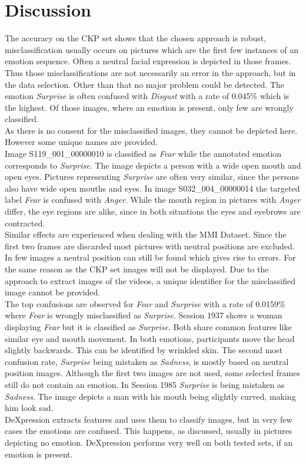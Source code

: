 \section{Discussion}
\label{sec:discussion}

The accuracy on the CKP set shows that the chosen approach is robust, misclassification usually occurs on pictures which are the first few instances of an emotion sequence. Often a neutral facial expression is depicted in those frames. Thus those misclassifications are not necessarily an error in the approach, but in the data selection. Other than that no major problem could be detected. The emotion \textit{Surprise} is often confused with \textit{Disgust} with a rate of 0.045\% which is the highest. Of those images, where an emotion is present, only few are wrongly classified.\\ 


As there is no consent for the misclassified images, they cannot be depicted here. However some unique names are provided. \\
Image S119\_001\_00000010 is classified as \textit{Fear} while the annotated emotion corresponds to \textit{Surprise}. The image depicts a person with a wide open mouth and open eyes. Pictures representing \textit{Surprise} are often very similar, since the persons also have wide open mouths and eyes. In image S032\_004\_00000014 the targeted label \textit{Fear} is confused with \textit{Anger}. While the mouth region in pictures with \textit{Anger} differ, the eye regions are alike, since in both situations the eyes and eyebrows are contracted.\\
Similar effects are experienced when dealing with the MMI Dataset. Since the first two frames are discarded most pictures with neutral positions are excluded. In few images a neutral position can still be found which gives rise to errors. For the same reason as the CKP set images will not be displayed. Due to the approach to extract images of the videos, a unique identifier for the misclassified image cannot be provided.\\
The top confusions are observed for \textit{Fear} and \textit{Surprise} with a rate of 0.0159\% where \textit{Fear} is wrongly misclassified as \textit{Surprise}. Session 1937 shows a woman displaying \textit{Fear} but it is classified as \textit{Surprise}. Both share common features like similar eye and mouth movement. In both emotions, participants move the head slightly backwards. This can be identified by wrinkled skin. The second most confusion rate, \textit{Surprise} being mistaken as \textit{Sadness}, is mostly based on neutral position images. Although the first two images are not used, some selected frames still do not contain an emotion. In Session 1985 \textit{Surprise} is being mistaken as \textit{Sadness}. The image depicts a man with his mouth being slightly curved, making him look sad.\\

DeXpression extracts features and uses them to classify images, but in very few cases the emotions are confused. This happens, as discussed, usually in pictures depicting no emotion. DeXpression performs very well on both tested sets, if an emotion is present.

